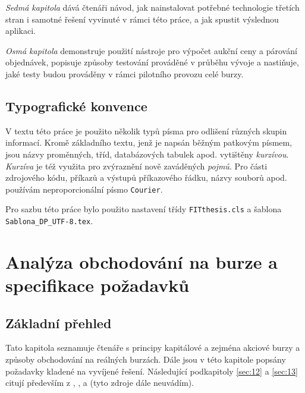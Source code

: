 \documentclass[thesis=M,czech]{FITthesis}[2012/06/26]
\begin{document}
\begin{introduction}
\textit{Sedmá kapitola} dává čtenáři návod, jak nainstalovat potřebné technologie třetích stran i samotné řešení 
vyvinuté v rámci této práce, a jak spustit výslednou aplikaci.

\textit{Osmá kapitola} demonstruje použití nástroje pro výpočet aukční ceny a párování objednávek, 
popisuje způsoby testování prováděné v průběhu vývoje a nastiňuje, jaké testy budou prováděny v rámci 
pilotního provozu celé burzy. 

	
\section{Typografické konvence}

V textu této práce je použito několik typů písma pro odlišení různých skupin informací. Kromě základního
textu, jenž je napsán běžným patkovým písmem, jsou názvy proměnných, tříd, databázových tabulek apod.
vytištěny \textit{kurzívou}. \textit{Kurzíva} je též využita pro zvýraznění nově zaváděných \textit{pojmů}. 
Pro části zdrojového kódu, příkazů a výstupů příkazového řádku, názvy souborů apod. používám neproporcionální 
písmo \texttt{Courier}.

Pro sazbu této práce bylo použito nastavení třídy \texttt{FITthesis.cls} a šablona \texttt{Sablona\_DP\_UTF-8.tex}.

\end{introduction}




\chapter{Analýza obchodování na burze a specifikace požadavků}

\section{Základní přehled}

Tato kapitola seznamuje čtenáře s principy kapitálové a zejména akciové burzy a způsoby obchodování na reálných 
burzách. Dále jsou v této kapitole popsány požadavky kladené na vyvíjené řešení. Následující podkapitoly 
\ref{sec:12} a \ref{sec:13} citují především z \cite{zakfin}, \cite{mekat}, \cite{zakpriban} a \cite{vseanal} 
(tyto zdroje dále neuvádím).
\end{document}
